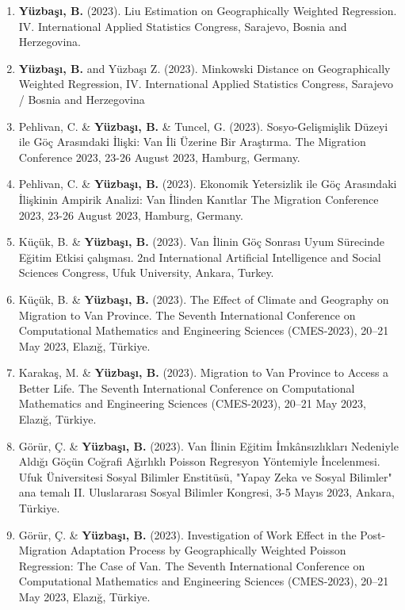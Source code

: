 \documentclass[10pt,letterpaper]{article}
\newenvironment{etaremune}{\begin{enumerate}}{\end{enumerate}}
\begin{document}
\begin{etaremune}
\renewcommand{\theenumi}{C2-\arabic{enumi}}



\item {\bf Y\"{u}zba\c{s}{\i}, B.} (2023). Liu Estimation on Geographically Weighted Regression. IV. International Applied Statistics Congress, Sarajevo, Bosnia and Herzegovina.

\item {\bf Y\"{u}zba\c{s}{\i}, B.} and Yüzbaşı Z. (2023). Minkowski Distance on Geographically Weighted Regression, IV. International Applied Statistics Congress, Sarajevo / Bosnia and Herzegovina
\item Pehlivan, C. \& {\bf Y\"{u}zba\c{s}{\i}, B.} \& Tuncel, G.  (2023). Sosyo-Gelişmişlik Düzeyi ile Göç Arasındaki İlişki: Van İli Üzerine Bir Araştırma. The Migration Conference 2023, 23-26 August 2023, Hamburg, Germany.
\item Pehlivan, C. \& {\bf Y\"{u}zba\c{s}{\i}, B.} (2023). Ekonomik Yetersizlik ile Göç Arasındaki İlişkinin Ampirik Analizi: Van İlinden Kanıtlar The Migration Conference 2023, 23-26 August 2023, Hamburg, Germany.
\item Küçük, B. \& {\bf Y\"{u}zba\c{s}{\i}, B.} (2023). Van İlinin Göç Sonrası Uyum Sürecinde Eğitim Etkisi çalışması. 2nd International Artificial Intelligence and Social Sciences Congress, Ufuk University, Ankara, Turkey.
\item Küçük, B. \& {\bf Y\"{u}zba\c{s}{\i}, B.} (2023). The Effect of Climate and Geography on Migration to Van Province. The Seventh International Conference on Computational Mathematics and Engineering Sciences (CMES-2023), 20--21 May 2023, Elazığ, Türkiye.
\item Karakaş, M. \& {\bf Y\"{u}zba\c{s}{\i}, B.} (2023). Migration to Van Province to Access a Better Life. The Seventh International Conference on Computational Mathematics and Engineering Sciences (CMES-2023), 20--21 May 2023, Elazığ, Türkiye.
\item Görür, Ç. \& {\bf Y\"{u}zba\c{s}{\i}, B.} (2023). Van İlinin Eğitim İmkânsızlıkları Nedeniyle Aldığı Göçün Coğrafi Ağırlıklı Poisson Regresyon Yöntemiyle İncelenmesi. Ufuk Üniversitesi Sosyal Bilimler Enstitüsü, "Yapay Zeka ve Sosyal Bilimler" ana temalı II. Uluslararası Sosyal Bilimler Kongresi, 3-5 Mayıs 2023, Ankara, Türkiye.
\item Görür, Ç. \& {\bf Y\"{u}zba\c{s}{\i}, B.} (2023). Investigation of Work Effect in the Post-Migration Adaptation Process by Geographically Weighted Poisson Regression: The Case of Van. The Seventh International Conference on Computational Mathematics and Engineering Sciences (CMES-2023), 20--21 May 2023, Elazığ, Türkiye.

\end{etaremune}
\end{document}
